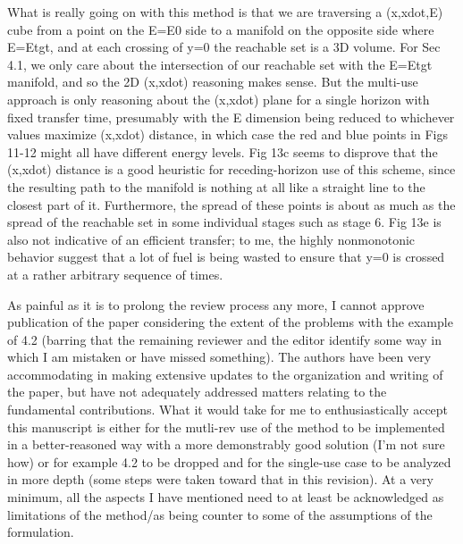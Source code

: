 \documentclass[11pt]{article}
\begin{document}
\begin{itemize}
\begin{itshape}
            What is really going on with this method is that we are traversing a
            (x,xdot,E) cube from a point on the E=E0 side to a manifold on the opposite
            side where E=Etgt, and at each crossing of y=0 the reachable set is a 3D
            volume.  For Sec 4.1, we only care about the intersection of our reachable
            set with the E=Etgt manifold, and so the 2D (x,xdot) reasoning makes sense.
            But the multi-use approach is only reasoning about the (x,xdot) plane for a
            single horizon with fixed transfer time, presumably with the E dimension
            being reduced to whichever values maximize (x,xdot) distance, in which case
            the red and blue points in Figs 11-12 might all have different energy
            levels.  Fig 13c seems to disprove that the (x,xdot) distance is a good
            heuristic for receding-horizon use of this scheme, since the resulting path
            to the manifold is nothing at all like a straight line to the closest part
            of it.  Furthermore, the spread of these points is about as much as the
            spread of the reachable set in some individual stages such as stage 6.  Fig
            13e is also not indicative of an efficient transfer; to me, the highly
            nonmonotonic behavior suggest that a lot of fuel is being wasted to ensure
            that y=0 is crossed at a rather arbitrary sequence of times.

            As painful as it is to prolong the review process any more, I cannot
            approve publication of the paper considering the extent of the problems
            with the example of 4.2 (barring that the remaining reviewer and the editor
            identify some way in which I am mistaken or have missed something).  The
            authors have been very accommodating in making extensive updates to the
            organization and writing of the paper, but have not adequately addressed
            matters relating to the fundamental contributions. What it would take for
            me to enthusiastically accept this manuscript is either for the mutli-rev
            use of the method to be implemented in a better-reasoned way with a more
            demonstrably good solution (I'm not sure how) or for example 4.2 to be
            dropped and for the single-use case to be analyzed in more depth (some
            steps were taken toward that in this revision). At a very minimum, all the
            aspects I have mentioned need to at least be acknowledged as limitations
            of the method/as being counter to some of the assumptions of the 
            formulation.
        \end{itshape}



\end{itemize}
\end{document}
